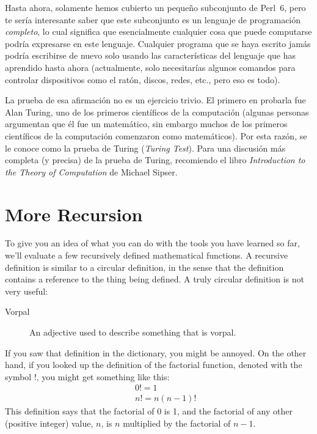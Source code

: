Hasta ahora, solamente hemos cubierto un pequeño subconjunto de Perl~6,
pero te sería interesante saber que este subconjunto es un lenguaje
de programación \emph{completo}, lo cual significa que esencialmente
cualquier cosa que puede computarse podría expresarse en este 
lenguaje. Cualquier programa que se haya escrito jamás podría escribirse
de nuevo solo usando las características del lenguaje que has aprendido
hasta ahora (actualmente, solo necesitarías algunos comandos para
controlar dispositivos como el ratón, discos, redes, etc., pero eso 
es todo).

La prueba de esa afirmación no es un ejercicio trivio. El primero
en probarla fue Alan Turing, uno de los primeros científicos de la
computación (algunas personas argumentan que él fue un matemático, sin 
embargo muchos de los primeros científicos de la computación comenzaron 
como matemáticos). Por esta razón, se le conoce como la prueba de Turing
(\emph{Turing Test}). Para una discusión más completa (y precisa) de la
prueba de Turing, recomiendo el libro  {\em Introduction to the
Theory of Computation} de Michael Sipser.

\section{More Recursion}
\label{more.recursion}


To give you an idea of what you can do with the tools you have learned
so far, we'll evaluate a few recursively defined mathematical
functions.  A recursive definition is similar to a circular
definition, in the sense that the definition contains a reference to
the thing being defined.  A truly circular definition is not very
useful:

\begin{description}

\item[Vorpal] An adjective used to describe something that is vorpal.

\end{description}

If you saw that definition in the dictionary, you might be annoyed. On
the other hand, if you looked up the definition of the factorial
function, denoted with the symbol $!$, you might get something like
this:
%
\begin{eqnarray*}
&&  0! = 1 \\
&&  n! = n (n-1)!
\end{eqnarray*}
%
This definition says that the factorial of 0 is 1, and the 
factorial of any other (positive integer) value, $n$, is 
$n$ multiplied by the factorial of $n-1$.


